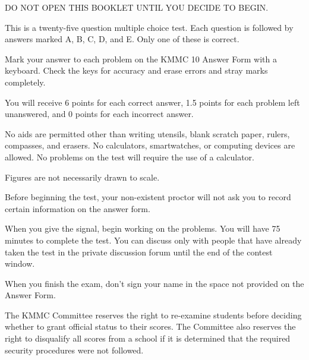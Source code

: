 \documentclass[10pt, twoside]{article}
\newcommand{\contestNumber}{10}
\newcommand{\contestName}{KMMC}
\newcommand{\committeeName}{KMMC Committee}
\begin{document}
\begin{justify}
\begin{enumerate}[noitemsep, nolistsep, leftmargin=*]

\normalsize{
\item DO NOT OPEN THIS BOOKLET UNTIL YOU DECIDE TO BEGIN.
\item This is a twenty-five question multiple choice test. Each question is followed by answers marked A, B, C, D, and E. Only one of these is correct.
\item Mark your answer to each problem on the {\contestName} {\contestNumber} Answer Form with a keyboard. Check the keys for accuracy and erase errors and stray marks completely.
\item You will receive 6 points for each correct answer, 1.5 points for each problem left unanswered, and 0 points for each incorrect answer.
\item No aids are permitted other than writing utensils, blank scratch paper, rulers, compasses, and erasers. No calculators, smartwatches, or computing devices are allowed. No problems on the test will require the use of a calculator.
\item Figures are not necessarily drawn to scale.
\item Before beginning the test, your non-existent proctor will not ask you to record certain information on the answer form. 
\item When you give the signal, begin working on the problems. You will have 75 minutes to complete the test. You can discuss only with people that have already taken the test in the private discussion forum until the end of the contest window.
\item When you finish the exam, don't sign your name in the space not provided on the Answer Form.
}

\end{enumerate}

\vspace{-4mm}

\begin{center} \noindent\hrulefill \end{center}

\vspace{-5mm}

\scriptsize{
\begin{justify}
The {\committeeName} reserves the right to re-examine students before deciding whether to grant official status to their scores. The Committee also reserves the right to disqualify all scores from a school if it is determined that the required security procedures were not followed.
\end{justify}

}
\end{justify}
\end{document}
